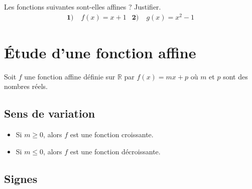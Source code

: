\documentclass[11pt]{article}
\begin{document}
\begin{app}
  Les fonctions suivantes sont-elles affines ? Justifier.
  \begin{align*}
    \textbf{1)}\;& f(x) = x+1 &
    \textbf{2)}\;& g(x) = x^2 - 1
  \end{align*}
\end{app}



\section{Étude d'une fonction affine}

Soit $f$ une fonction affine définie sur $\mathbb{R}$ par $f(x)=mx+p$ où $m$ et
$p$ sont des nombres réels.


\subsection{Sens de variation}
\begin{prop}
  \begin{itemize}
    \item Si $m\geq 0$, alors $f$ est une fonction croissante.
    \item Si $m\leq 0$, alors $f$ est une fonction décroissante.
  \end{itemize}
\end{prop}

\subsection{Signes}
  \begin{center}
  \end{center}
\end{document}
